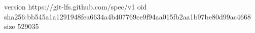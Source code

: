 version https://git-lfs.github.com/spec/v1
oid sha256:bb545a1a1291948fea6634a4b407769ce9f94aa015fb2aa1b97be80d99ac4668
size 529035
